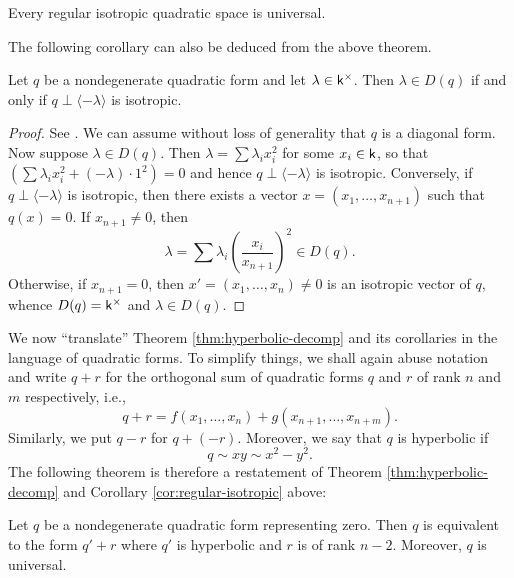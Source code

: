 \begin{corollaryx}\label{cor:regular-isotropic}
    Every regular isotropic quadratic space is universal.
\end{corollaryx}

The following corollary can also be deduced from the above theorem.

\begin{corollaryx}\label{cor:rep-theorem-1}
    Let \(q\) be a nondegenerate quadratic form and let \(\lambda \in \mathsf{k}^{\times}\). Then \(\lambda \in D(q)\) if and only if \(q \perp \langle -\lambda \rangle\) is isotropic.
\end{corollaryx}

\begin{proof}
    See \cite[pp.~14--15]{lam1973quadratic}. We can assume without loss of generality that \(q\) is a diagonal form. Now suppose \(\lambda \in D(q)\). Then \(\lambda = \sum \lambda_i x_i^2\) for some \(x_i \in \mathsf{k}\), so that \(\left(\sum \lambda_ix_i^2 + (-\lambda) \cdot 1^2 \right) = 0\) and hence \(q \perp \langle -\lambda \rangle\) is isotropic. Conversely, if \(q \perp \langle -\lambda \rangle\) is isotropic, then there exists a vector \(x = (x_1, \dots, x_{n+1})\) such that \(q(x) = 0\). If \(x_{n+1} \neq 0\), then
    \[
        \lambda = \sum \lambda_i\left(\frac{x_i}{x_{n+1}}\right)^2 \in D(q).
    \]
    Otherwise, if \(x_{n+1} = 0\), then \(x' = (x_1, \dots, x_n) \neq 0\) is an isotropic vector of \(q\), whence \(D(q) = \mathsf{k}^{\times}\) and \(\lambda \in D(q)\).
\end{proof}

We now ``translate'' Theorem \ref{thm:hyperbolic-decomp} and its corollaries in the language of quadratic forms. To simplify things, we shall again abuse notation and write \(q + r\) for the orthogonal sum of quadratic forms \(q\) and \(r\) of rank \(n\) and \(m\) respectively, i.e.,
\[q + r = f(x_1, \dots, x_n) + g(x_{n+1}, \dots, x_{n+m}).\]
Similarly, we put \(q - r\) for \(q + (-r)\). Moreover, we say that \(q\) is hyperbolic if
\[
    q \sim xy \sim x^2 - y^2.
\]
The following theorem is therefore a restatement of Theorem \ref{thm:hyperbolic-decomp} and Corollary \ref{cor:regular-isotropic} above:

\begin{theoremx}\label{thm:hyperbolic-decomp-2}
    Let \(q\) be a nondegenerate quadratic form representing zero. Then \(q\) is equivalent to the form \(q' + r\) where \(q'\) is hyperbolic and \(r\) is of rank \(n - 2\). Moreover, \(q\) is universal.
\end{theoremx}

